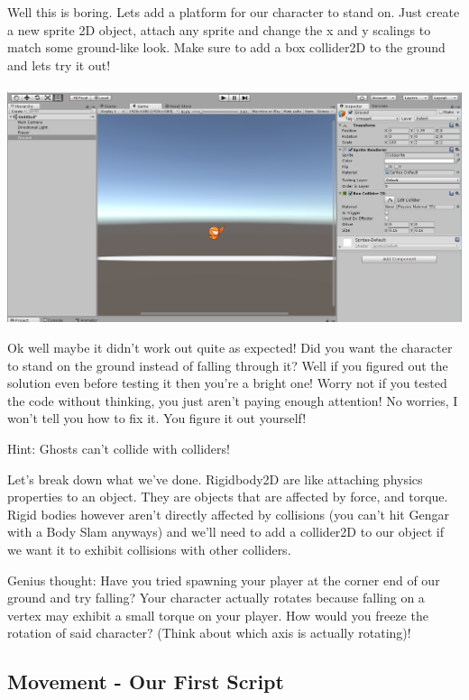 \documentclass[12pt]{article}
\begin{document}
Well this is boring. Lets add a platform for our character to stand on. Just create a new sprite 2D object, attach any sprite and change the x and y scalings to match some ground-like look. Make sure to add a box collider2D to the ground and lets try it out!
\\\\
\includegraphics[scale=0.5]{Figure0311}

Ok well maybe it didn't work out quite as expected! Did you want the character to stand on the ground instead of falling through it? Well if you figured out the solution even before testing it then you're a bright one! Worry not if you tested the code without thinking, you just aren't paying enough attention! No worries, I won't tell you how to fix it. You figure it out yourself!

Hint: Ghosts can't collide with colliders!

Let's break down what we've done. Rigidbody2D are like attaching physics properties to an object. They are objects that are affected by force, and torque. Rigid bodies however aren't directly affected by collisions (you can't hit Gengar with a Body Slam anyways) and we'll need to add a collider2D to our object if we want it to exhibit collisions with other colliders. 

Genius thought: Have you tried spawning your player at the corner end of our ground and try falling? Your character actually rotates because falling on a vertex may exhibit a small torque on your player. How would you freeze the rotation of said character? (Think about which axis is actually rotating)!

\newpage

\subsection{Movement - Our First Script}
\end{document}
